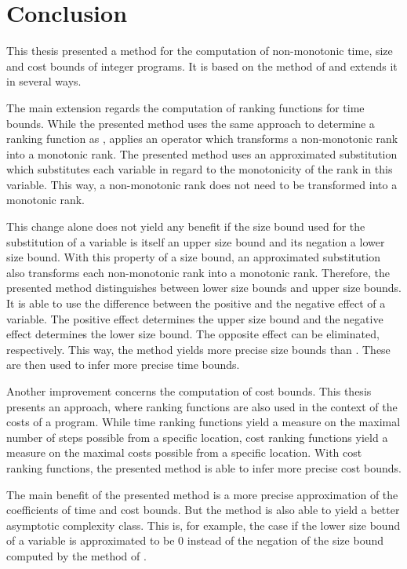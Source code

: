 \section{Conclusion}

This thesis presented a method for the computation of non-monotonic time, size and cost bounds of integer programs.
It is based on the method of \cite{koat} and extends it in several ways.

The main extension regards the computation of ranking functions for time bounds.
While the presented method uses the same approach to determine a ranking function as \cite{koat}, \cite{koat} applies an operator which transforms a non-monotonic rank into a monotonic rank.
The presented method uses an approximated substitution which substitutes each variable in regard to the monotonicity of the rank in this variable.
This way, a non-monotonic rank does not need to be transformed into a monotonic rank.

This change alone does not yield any benefit if the size bound used for the substitution of a variable is itself an upper size bound and its negation a lower size bound.
With this property of a size bound, an approximated substitution also transforms each non-monotonic rank into a monotonic rank.
Therefore, the presented method distinguishes between lower size bounds and upper size bounds.
It is able to use the difference between the positive and the negative effect of a variable.
The positive effect determines the upper size bound and the negative effect determines the lower size bound.
The opposite effect can be eliminated, respectively.
This way, the method yields more precise size bounds than \cite{koat}.
These are then used to infer more precise time bounds.

Another improvement concerns the computation of cost bounds.
This thesis presents an approach, where ranking functions are also used in the context of the costs of a program.
While time ranking functions yield a measure on the maximal number of steps possible from a specific location, cost ranking functions yield a measure on the maximal costs possible from a specific location.
With cost ranking functions, the presented method is able to infer more precise cost bounds.

The main benefit of the presented method is a more precise approximation of the coefficients of time and cost bounds.
But the method is also able to yield a better asymptotic complexity class.
This is, for example, the case if the lower size bound of a variable is approximated to be $0$ instead of the negation of the size bound computed by the method of \cite{koat}.

